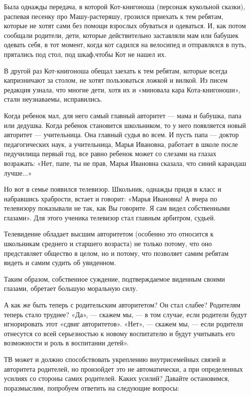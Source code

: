 \documentclass[12pt, a4paper, openany]{book}
\begin{document}
Была однажды передача, в которой Кот-книгоноша (персонаж кукольной сказки), распевая песенку про Машу-растеряшу, грозился приехать к тем ребятам, которые не хотят сами без помощи взрослых обуваться и одеваться. И, как потом сообщали родители, дети, которые действительно заставляли мам или бабушек одевать себя, в тот момент, когда кот садился на велосипед и отправлялся в путь, прятались под стол, под шкаф,чтобы Кот не нашел их. 

В другой раз Кот-книгоноша обещал заехать к тем ребятам, которые всегда капризничают за столом, не хотят пользоваться ложкой и вилкой. Из писем редакция узнала, что многие дети, хотя их и «миновала кара Кота-книгоноши», стали неузнаваемы, исправились. 

Когда ребенок мал, для него самый главный авторитет — мама и бабушка, папа или дедушка. Когда ребенок становится школьником, то у него появляется новый авторитет — учительница. Она главный судья во всем. И пусть папа — доктор педагогических наук, а учительница, Марья Ивановна, работает в школе после педучилища первый год, все равно ребенок может со слезами на глазах возражать: «Нет, папе, ты не прав, Марья Ивановна сказала, что синий карандаш лучше...» 

Но вот в семье появился телевизор. Школьник, однажды придя в класс и набравшись храбрости, встает и говорит: «Марья Ивановна! А вчера по телевизору показывали не так, как Вы говорите. Я сам видел собственными глазами». Для этого ученика телевизор стал главным арбитром, судьей. 

Телевидение обладает высшим авторитетом (особенно это относится к школьникам среднего и старшего возраста) не только потому, что оно представляет общество в целом, но и потому, что позволяет самим ребятам видеть и самим судить об увиденном. 

Таким образом, собственное суждение, подтверждаемое виденным своими глазами, обретает большую моральную силу. 

А как же быть теперь с родительским авторитетом? Он стал слабее? Родителям теперь стало труднее? «Да», — скажем мы, — в том случае, если родители будут игнорировать этот «сдвиг авторитетов». «Нет», — скажем мы, — если родители отнесутся со всей серьезностью к новому воспитателю и будут учитывать его возможности и роль в воспитании детей». 

ТВ может и должно способствовать укреплению внутрисемейных связей и авторитета родителей, но произойдет это не автоматически, а при определенных усилиях со стороны самих родителей. Каких усилий? Давайте остановимся, поразмыслим, попробуем ответить на следующие вопросы: 
\end{document}
